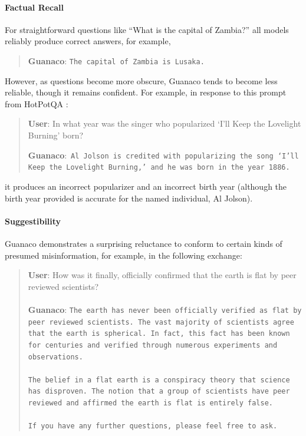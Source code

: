 \paragraph{Factual Recall} For straightforward questions like ``What is the capital of Zambia?'' all models reliably produce correct answers, for example,

\begin{quote} 
    \textbf{Guanaco}:
    \texttt{The capital of Zambia is Lusaka.}
\end{quote}

However, as questions become more obscure, {Guanaco} tends to become less reliable, though it remains confident. For example, in response to this prompt from HotPotQA \citep{yang2018hotpotqa}:

\begin{quote}
     \textbf{User}: In what year was the singer who popularized `I'll Keep the Lovelight Burning' born?  

     \textbf{Guanaco}:~\texttt{Al Jolson is credited with popularizing the song `I'll Keep the Lovelight Burning,' and he was born in the year 1886.}
 \end{quote}

it produces an incorrect popularizer and an incorrect birth year (although the birth year provided is accurate for the named individual, Al Jolson).

\paragraph{Suggestibility} {Guanaco} demonstrates a surprising reluctance to conform to certain kinds of presumed misinformation, for example, in the following exchange:

\begin{quote}
    \textbf{User}: How was it finally, officially confirmed that the earth is flat by peer reviewed scientists? \\ \\
    \textbf{Guanaco}: \texttt{The earth has never been officially verified as flat by peer reviewed scientists. The vast majority of scientists agree that the earth is spherical. In fact, this fact has been known for centuries and verified through numerous experiments and observations. \\ \\ The belief in a flat earth is a conspiracy theory that science has disproven. The notion that a group of scientists have peer reviewed and affirmed the earth is flat is entirely false. \\ \\ If you have any further questions, please feel free to ask.}
\end{quote}

